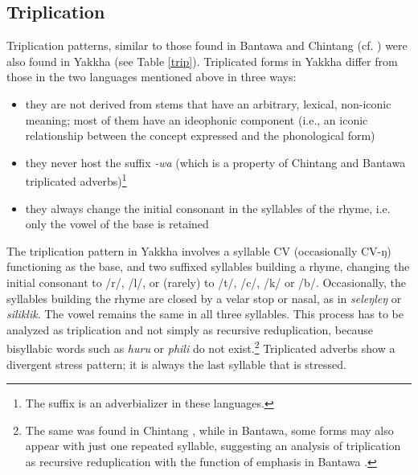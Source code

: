 \subsection{Triplication}\label{sec-trip}

Triplication patterns, similar to those found in Bantawa and Chintang (cf. \citet{Rai1984A-descriptive, Raietal1997Triplicated, Raietal2005Triplication}) were also found in Yakkha (see Table \ref{trip}). Triplicated forms in Yakkha differ from those in the two  languages mentioned above in three ways: 

\begin{itemize}
\item  they are not derived from stems that have an arbitrary, lexical, non-iconic meaning; most of them have an ideophonic component (i.e., an iconic relationship between the concept expressed and the phonological form)
\item  they never host the suffix \emph{-wa} (which is a property of Chintang and Bantawa triplicated adverbs)\footnote{The suffix is an adverbializer in these languages.}
\item they always change the initial consonant in the syllables of the rhyme, i.e. only the vowel of the base is retained
\end{itemize}


The triplication pattern in Yakkha involves a syllable CV (occasionally CV-ŋ) functioning as the base, and two suffixed syllables building a rhyme, changing the initial consonant to /r/, /l/, or (rarely) to /t/, /c/, /k/ or /b/. Occasionally, the syllables building the rhyme are closed by a velar stop or nasal, as in \emph{seleŋleŋ} or \emph{siliklik}. The vowel remains the same in all three syllables. This process has to be analyzed as triplication and not simply as recursive reduplication, because bisyllabic words such as \emph{huru} or \emph{phili} do not exist.\footnote{The same was found in Chintang \citep{Raietal2005Triplication}, while in  Bantawa, some forms may also appear with just one repeated syllable, suggesting an analysis of triplication as recursive reduplication with the function of emphasis in Bantawa \citep[304]{Doornenbal2009A-grammar}.} Triplicated adverbs show a divergent stress pattern; it is always the last syllable that is stressed.



